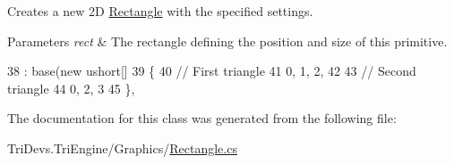 Creates a new 2\-D \hyperlink{class_tri_devs_1_1_tri_engine_1_1_graphics_1_1_rectangle}{Rectangle} with the specified settings. 


\begin{DoxyParams}{Parameters}
{\em rect} & The rectangle defining the position and size of this primitive.\\
\hline
\end{DoxyParams}

\begin{DoxyCode}
38             : base(\textcolor{keyword}{new} ushort[]
39             \{
40                 \textcolor{comment}{// First triangle}
41                 0, 1, 2,
42 
43                 \textcolor{comment}{// Second triangle}
44                 0, 2, 3
45             \}, 
\end{DoxyCode}


The documentation for this class was generated from the following file\-:\begin{DoxyCompactItemize}
\item 
Tri\-Devs.\-Tri\-Engine/\-Graphics/\hyperlink{_graphics_2_rectangle_8cs}{Rectangle.\-cs}\end{DoxyCompactItemize}
